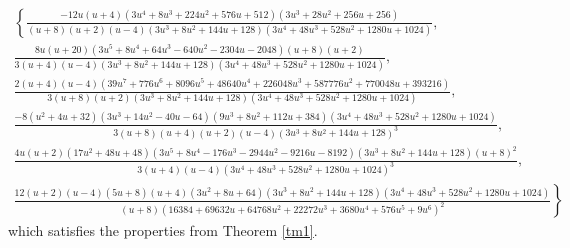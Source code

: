 \documentclass[a4paper]{amsart}
\theoremstyle{plain}
\theoremstyle{definition}
\begin{document}

{\tiny
\begin{gather*}
 \left\{ 
\frac{-12u(u+4)(3u^4+8u^3+224u^2+576u+512)(3u^3+28u^2+256u+256)}
{(u+8)(u+2)(u-4)(3u^3+8u^2+144u+128)(3u^4+48u^3+528u^2+1280u+1024)}, \right. \\  
\frac{8u(u+20)(3u^5+8u^4+64u^3-640u^2-2304u-2048)(u+8)(u+2)}
{3(u+4)(u-4)(3u^3+8u^2+144u+128)(3u^4+48u^3+528u^2+1280u+1024)}, \\
\frac{2(u+4)(u-4)(39u^7+776u^6+8096u^5+48640u^4+226048u^3+587776u^2+770048u+393216)}
{3(u+8)(u+2)(3u^3+8u^2+144u+128)(3u^4+48u^3+528u^2+1280u+1024)}, \\
 \frac{-8(u^2+4u+32)(3u^3+14u^2-40u-64)(9u^3+8u^2+112u+384)(3u^4+48u^3+528u^2+1280u+1024)}
{3(u+8)(u+4)(u+2)(u-4)(3u^3+8u^2+144u+128)^3}, \\
\frac{4u(u+2)(17u^2+48u+48)(3u^5+8u^4-176u^3-2944u^2-9216u-8192)(3u^3+8u^2+144u+128)(u+8)^2}
{3(u+4)(u-4)(3u^4+48u^3+528u^2+1280u+1024)^3}, \\  
\left. \frac{12(u+2)(u-4)(5u+8)(u+4)(3u^2+8u+64)(3u^3+8u^2+144u+128)(3u^4+48u^3+528u^2+1280u+1024)}
{(u+8)(16384+69632u+64768u^2+22272u^3+3680u^4+576u^5+9u^6)^2}  \right\}
\end{gather*} }%
which satisfies the properties from Theorem \ref{tm1}.

\medskip
\end{document}

